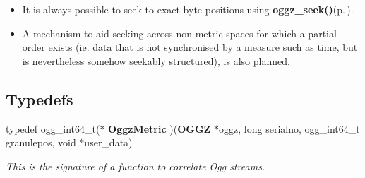 \begin{itemize}
\item It is always possible to seek to exact byte positions using {\bf oggz\_\-seek()}{\rm (p.\,\pageref{group__seek__api_a6})}.\end{itemize}


\begin{itemize}
\item A mechanism to aid seeking across non-metric spaces for which a partial order exists (ie. data that is not synchronised by a measure such as time, but is nevertheless somehow seekably structured), is also planned. \end{itemize}


\subsection*{Typedefs}
\begin{CompactItemize}
\item 
typedef ogg\_\-int64\_\-t($\ast$ {\bf Oggz\-Metric} )({\bf OGGZ} $\ast$oggz, long serialno, ogg\_\-int64\_\-t granulepos, void $\ast$user\_\-data)
\begin{CompactList}\small\item\em This is the signature of a function to correlate Ogg streams. \item\end{CompactList}\end{CompactItemize}
